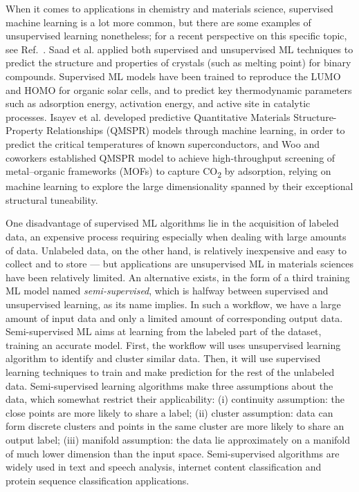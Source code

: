 \documentclass[aip,apm,amsmath,amssymb,reprint]{revtex4-2}
\begin{document}
When it comes to applications in chemistry and materials science, supervised machine learning is a lot more common, but there are some examples of unsupervised learning nonetheless; for a recent perspective on this specific topic, see Ref.~. Saad et al. applied both supervised and unsupervised ML techniques to predict the structure and properties of crystals (such as melting point) for binary compounds.\cite{Saad2012} Supervised ML models have been trained to reproduce the LUMO and HOMO for organic solar cells,\cite{Pereira2016} and to predict key thermodynamic parameters such as adsorption energy,\cite{Toyao2018} activation energy,\cite{Takahashi2018} and active site\cite{Jinnouchi2017} in catalytic processes. Isayev et al. developed predictive Quantitative Materials Structure-Property Relationships (QMSPR) models through machine learning, in order to predict the critical temperatures of known superconductors,\cite{Isayev2015} and Woo and coworkers established QMSPR model to achieve high-throughput screening of metal--organic frameworks (MOFs) to capture CO\textsubscript{2} by adsorption, relying on machine learning to explore the large dimensionality spanned by their exceptional structural tuneability.

One disadvantage of supervised ML algorithms lie in the acquisition of labeled data, an expensive process requiring especially when dealing with large amounts of data. Unlabeled data, on the other hand, is relatively inexpensive and easy to collect and to store --- but applications are unsupervised ML in materials sciences have been relatively limited. An alternative exists, in the form of a third training ML model named \emph{semi-supervised}, which is halfway between supervised and unsupervised learning, as its name implies. In such a workflow, we have a large amount of input data and only a limited amount of corresponding output data. Semi-supervised ML aims at learning from the labeled part of the dataset, training an accurate model. First, the workflow will uses unsupervised learning algorithm to identify and cluster similar data. Then, it will use supervised learning techniques to train and make prediction for the rest of the unlabeled data. Semi-supervised learning algorithms make three assumptions about the data, which somewhat restrict their applicability: (i) continuity assumption: the close points are more likely to share a label; (ii) cluster assumption: data can form discrete clusters and points in the same cluster are more likely to share an output label; (iii) manifold assumption: the data lie approximately on a manifold of much lower dimension than the input space. Semi-supervised algorithms are widely used in text and speech analysis, internet content classification and protein sequence classification applications.
\end{document}
